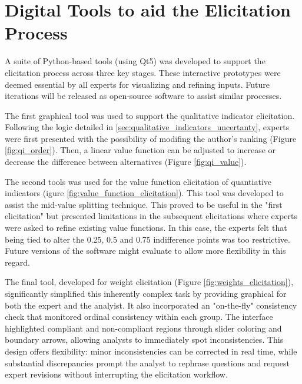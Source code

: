 \section{Digital Tools to aid the Elicitation Process}
\label{sec:digital_tools}
A suite of Python-based tools (using Qt5) was developed to support the elicitation process across three key stages. These interactive prototypes were deemed essential by all experts for visualizing and refining inputs. Future iterations will be released as open-source software to assist similar processes.
    
The first graphical tool was used to support the qualitative indicator elicitation. Following the logic detailed in \ref{sec:qualitative_indicators_uncertanty}, experts were first presented with the possibility of modifing the author's ranking (Figure \ref{fig:qi_order}). Then, a linear value function can be adjusted to increase or decrease the difference between alternatives (Figure \ref{fig:qi_value}).

The second tools was used for the value function elicitation of quantiative indicators (igure \ref{fig:value_function_elicitation}). This tool was developed to assist the mid-value splitting technique. This proved to be useful in the "first elicitation" but presented limitations in the subsequent elicitations where experts were asked to refine existing value functions. In this case, the experts felt that being tied to alter the 0.25, 0.5 and 0.75 indifference points was too restrictive. Future versions of the software might evaluate to allow more flexibility in this regard.

The final tool, developed for weight elicitation (Figure \ref{fig:weights_elicitation}), significantly simplified this inherently complex task by providing graphical for both the expert and the analyist. It also incorporated an "on-the-fly" consistency check that monitored ordinal consistency within each group. The interface highlighted compliant and non-compliant regions through slider coloring and boundary arrows, allowing analysts to immediately spot inconsistencies. This design offers flexibility: minor inconsistencies can be corrected in real time, while substantial discrepancies prompt the analyst to rephrase questions and request expert revisions without interrupting the elicitation workflow.

